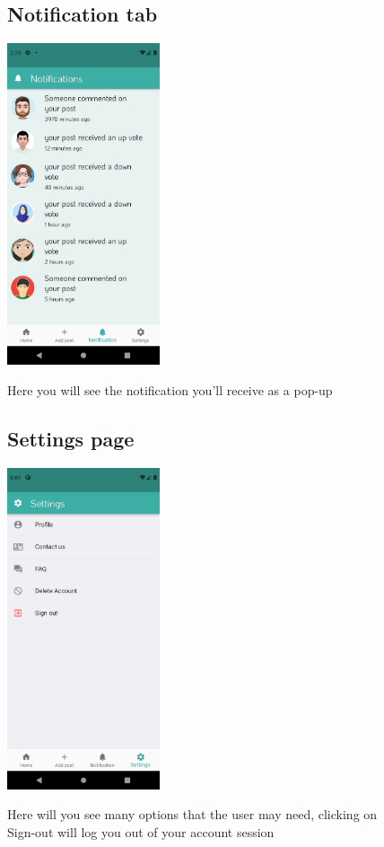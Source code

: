 \documentclass[12pt]{article}
\begin{document}
\begin{figure}[h!]
  \subsection*{Notification tab}
{\includegraphics[width=0.4\textwidth]{./Screenshots/16.PNG}}
  \caption{Here you will see the notification you'll receive as a pop-up}
  \end{figure}
  
  \begin{figure}[h!]
  \subsection*{Settings page}
{\includegraphics[width=0.4\textwidth]{./Screenshots/17.PNG}}
  \caption{Here will you see many options that the user may need, clicking on Sign-out will log you out of your account session}
  \end{figure}
  
\end{document}
